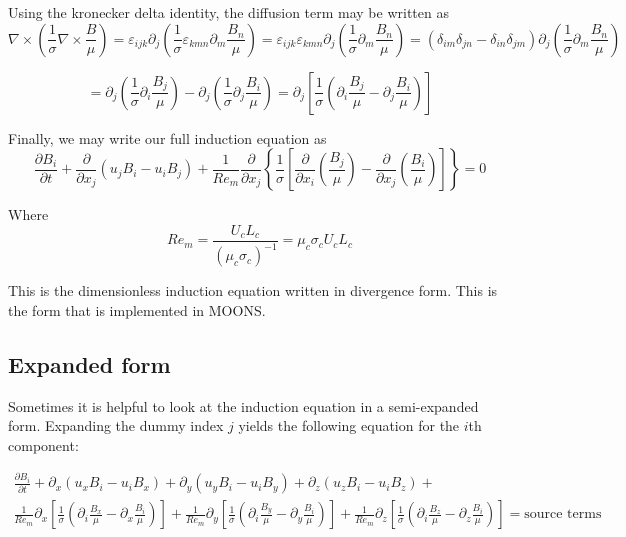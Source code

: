 \documentclass[11pt]{article}
\begin{document}
Using the kronecker delta identity, the diffusion term may be written as
\begin{equation}
	\nabla \times \left( \frac{1}{\sigma} \nabla \times \frac{B}{\mu} \right)
	 = \varepsilon_{ijk} \partial_j \left( \frac{1}{\sigma} \varepsilon_{kmn} \partial_m \frac{B_n}{\mu} \right)
	  = \varepsilon_{ijk} \varepsilon_{kmn} \partial_j \left( \frac{1}{\sigma} \partial_m \frac{B_n}{\mu} \right)
	  = (\delta_{im}\delta_{jn} - \delta_{in}\delta_{jm}) \partial_j \left( \frac{1}{\sigma} \partial_m \frac{B_n}{\mu} \right)
\end{equation}

\begin{equation}
	  = \partial_j \left( \frac{1}{\sigma} \partial_i \frac{B_j}{\mu} \right) 
	  - \partial_j \left( \frac{1}{\sigma} \partial_j \frac{B_i}{\mu} \right)
	  = \partial_j \left[ \frac{1}{\sigma} \left( \partial_i \frac{B_j}{\mu} - \partial_j \frac{B_i}{\mu} \right) \right]
\end{equation}

Finally, we may write our full induction equation as
\begin{equation}
	\boxed{
	\frac{\partial B_i}{\partial t} 
	+ \frac{\partial}{\partial x_j} (u_j B_i - u_i B_j) 
	+ \frac{1}{Re_m}
	\frac{\partial}{\partial x_j} 
	\left\{ \frac{1}{\sigma} 
	\left[ 
	\frac{\partial}{\partial x_i} 
	\left( \frac{B_j}{\mu} \right) - 
	\frac{\partial}{\partial x_j} 
	\left( \frac{B_i}{\mu} \right)
	\right]
	\right\} = 0
	}
\end{equation}

Where
\begin{equation}
	\boxed{
	Re_m = \frac{U_c L_c}{(\mu_c \sigma_c)^{-1}} = \mu_c \sigma_c U_c L_c
	}
\end{equation}

This is the dimensionless induction equation written in divergence form. This is the form that is implemented in MOONS.

\subsection{Expanded form}
Sometimes it is helpful to look at the induction equation in a semi-expanded form. Expanding the dummy index $j$ yields the following equation for the $i$th component:

\begin{multline}
	\frac{\partial B_i}{\partial t} + 
	\partial_x (u_x B_i - u_i B_x) + 
	\partial_y (u_y B_i - u_i B_y) + 
	\partial_z (u_z B_i - u_i B_z) + \\
	\frac{1}{Re_m}
	\partial_x \left[ \frac{1}{\sigma} \left( \partial_i \frac{B_x}{\mu} - \partial_x \frac{B_i}{\mu} \right) \right] + 
	\frac{1}{Re_m}
	\partial_y \left[ \frac{1}{\sigma} \left( \partial_i \frac{B_y}{\mu} - \partial_y \frac{B_i}{\mu} \right) \right] + 
	\frac{1}{Re_m}
	\partial_z \left[ \frac{1}{\sigma} \left( \partial_i \frac{B_z}{\mu} - \partial_z \frac{B_i}{\mu} \right) \right]  = \text{source terms}
\end{multline}
\end{document}
